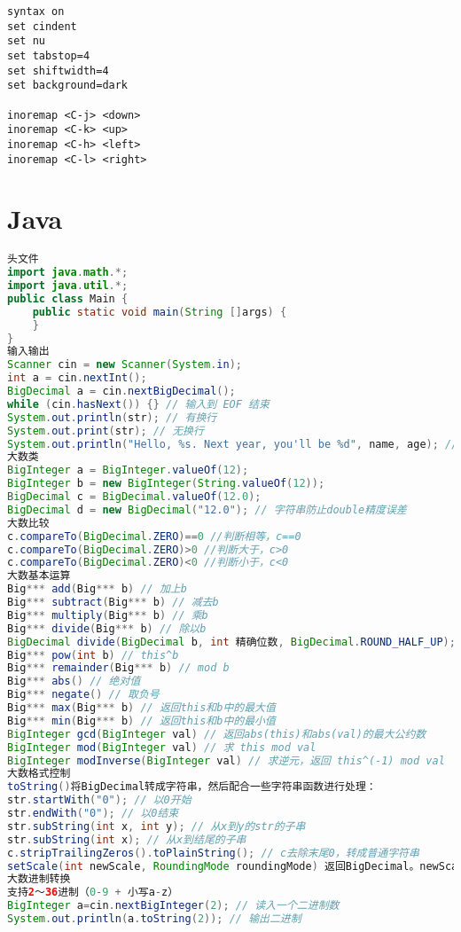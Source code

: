 \documentclass{article}
\begin{document}
\begin{lstlisting}
syntax on
set cindent
set nu
set tabstop=4
set shiftwidth=4
set background=dark

inoremap <C-j> <down>
inoremap <C-k> <up>
inoremap <C-h> <left>
inoremap <C-l> <right>
\end{lstlisting}

\section{Java}

\begin{lstlisting}[language=java]
头文件
import java.math.*;
import java.util.*;
public class Main {
	public static void main(String []args) {
	}
}
输入输出
Scanner cin = new Scanner(System.in);
int a = cin.nextInt();
BigDecimal a = cin.nextBigDecimal();
while (cin.hasNext()) {} // 输入到 EOF 结束
System.out.println(str); // 有换行
System.out.print(str); // 无换行
System.out.println("Hello, %s. Next year, you'll be %d", name, age); // C风格输出
大数类
BigInteger a = BigInteger.valueOf(12);
BigInteger b = new BigInteger(String.valueOf(12));
BigDecimal c = BigDecimal.valueOf(12.0);
BigDecimal d = new BigDecimal("12.0"); // 字符串防止double精度误差
大数比较
c.compareTo(BigDecimal.ZERO)==0 //判断相等，c==0
c.compareTo(BigDecimal.ZERO)>0 //判断大于，c>0
c.compareTo(BigDecimal.ZERO)<0 //判断小于，c<0
大数基本运算
Big*** add(Big*** b) // 加上b
Big*** subtract(Big*** b) // 减去b
Big*** multiply(Big*** b) // 乘b
Big*** divide(Big*** b) // 除以b
BigDecimal divide(BigDecimal b, int 精确位数, BigDecimal.ROUND_HALF_UP); // 除以b，保留小数
Big*** pow(int b) // this^b
Big*** remainder(Big*** b) // mod b
Big*** abs() // 绝对值
Big*** negate() // 取负号
Big*** max(Big*** b) // 返回this和b中的最大值
Big*** min(Big*** b) // 返回this和b中的最小值
BigInteger gcd(BigInteger val) // 返回abs(this)和abs(val)的最大公约数
BigInteger mod(BigInteger val) // 求 this mod val
BigInteger modInverse(BigInteger val) // 求逆元，返回 this^(-1) mod val
大数格式控制
toString()将BigDecimal转成字符串，然后配合一些字符串函数进行处理：
str.startWith("0"); // 以0开始
str.endWith("0"); // 以0结束
str.subString(int x, int y); // 从x到y的str的子串
str.subString(int x); // 从x到结尾的子串
c.stripTrailingZeros().toPlainString(); // c去除末尾0，转成普通字符串
setScale(int newScale, RoundingMode roundingMode) 返回BigDecimal。newScale表示保留位数。CEILING/DOWN/FLOOR/HALF_DOWN/HALF_UP。
大数进制转换
支持2～36进制（0-9 + 小写a-z）
BigInteger a=cin.nextBigInteger(2); // 读入一个二进制数
System.out.println(a.toString(2)); // 输出二进制
\end{lstlisting}
\end{document}
